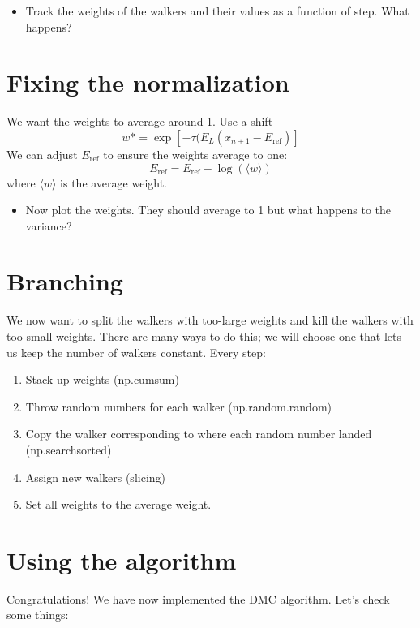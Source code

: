 \documentclass[12pt]{article}
\begin{document}
\begin{itemize}
\item Track the weights of the walkers and their values as a function of step. What happens?
\end{itemize}

\section{Fixing the normalization}

We want the weights to average around 1.
Use a shift 
\begin{equation}
w*=	\exp[-\tau (E_L(x_{n+1}-E_{\text{ref}})] 
\end{equation}
We can adjust $E_{\text {ref}}$ to ensure the weights average to one:
\begin{equation}
E_{\text{ref}}=E_{\text{ref}}-\log(\langle w \rangle) 
\end{equation}
where $\langle w \rangle$ is the average weight. 

\begin{itemize}
\item Now plot the weights. They should average to 1 but what happens to the variance?
\end{itemize}

\section{Branching} 

We now want to split the walkers with too-large weights and kill the walkers with too-small weights. 
There are many ways to do this; we will choose one that lets us keep the number of walkers constant. 
Every step:
\begin{enumerate}
\item Stack up weights (np.cumsum)
\item Throw random numbers for each walker (np.random.random)
\item Copy the walker corresponding to where each random number landed (np.searchsorted)
\item Assign new walkers (slicing)
\item Set all weights to the average weight.
\end{enumerate}
\section{Using the algorithm}
Congratulations! We have now implemented the DMC algorithm. 
Let's check some things:
\end{document}
